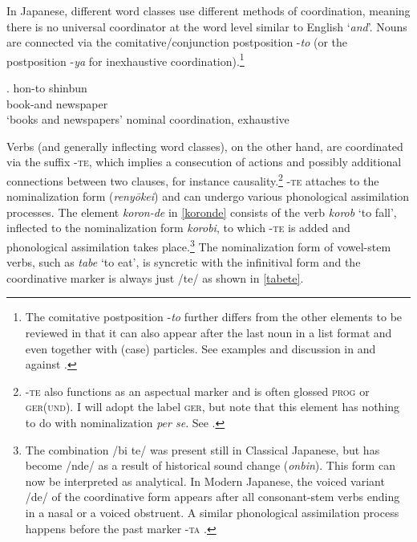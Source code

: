 \largerpage[-2]
In Japanese, different word classes use different methods of coordination, meaning there is no universal coordinator at the word level similar to English `\textit{and}'. Nouns are connected via the comitative/conjunction postposition -\textit{to} (or the postposition -\textit{ya} for inexhaustive coordination).\footnote{The comitative postposition -\textit{to} further differs from the other elements to be reviewed in that it can also appear after the last noun in a list format and even together with (case) particles. See examples and discussion in \citet{kuno:1973:structure} and \citet{hiraiwa:2014:constraining} against \citet{tatsumi:2018:splitting}.}

\exg. hon-to shinbun\\
book-and newspaper\\
`books and newspapers'     \hfill nominal coordination, exhaustive\par

\largerpage
Verbs (and generally inflecting word classes), on the other hand, are coordinated via the suffix -\textsc{te}, which implies a consecution of actions and possibly additional connections between two clauses, for instance causality.\footnote{-\textsc{te} also functions as an aspectual marker and is often glossed \textsc{prog} or \textsc{ger(und)}. I will adopt the label \textsc{ger}, but note that this element has nothing to do with nominalization \textit{per se}. See \citet{hasegawa:1996:study, mihara:2013:tekei, nakatani:2013:predicate, nakatani:2016:complex}.} -\textsc{te} attaches to the nominalization form (\textit{renyōkei}) and can undergo various phonological assimilation processes. The element \textit{koron-de} in \ref{koronde} consists of the verb \textit{korob} `to fall’, inflected to the nominalization form \textit{korobi}, to which -\textsc{te} is added and phonological assimilation takes place.\footnote{The combination /bi te/ was present still in Classical Japanese, but has become /nde/ as a result of historical sound change (\textit{onbin}). This form can now be interpreted as analytical. In Modern Japanese, the voiced variant /de/ of the coordinative form appears after all consonant-stem verbs ending in a nasal or a voiced obstruent. A similar phonological assimilation process happens before the past marker -\textsc{ta} \citep{ito:2015:word}.} The nominalization form of vowel-stem verbs, such as \textit{tabe} `to eat’, is syncretic with the infinitival form and the coordinative marker is always just /te/ as shown in \ref{tabete}. 

